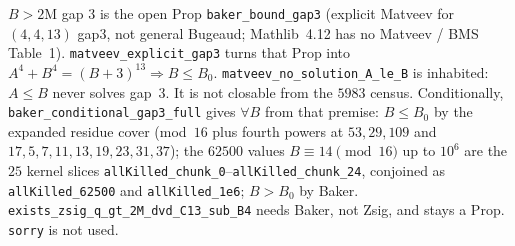 \documentclass[12pt]{amsart}
\begin{document}
$B>2\mathrm{M}$ gap $3$ is the open Prop
\texttt{baker\_bound\_gap3}
(explicit Matveev for $(4,4,13)$ gap3, not
general Bugeaud; Mathlib~4.12 has no
Matveev / BMS Table~1).
\texttt{matveev\_explicit\_gap3} turns that
Prop into $A^4+B^4=(B+3)^{13}\Rightarrow B\le B_0$.
\texttt{matveev\_no\_solution\_A\_le\_B} is
inhabited: $A\le B$ never solves gap~$3$.
It is not closable from the $5983$ census.
Conditionally,
\texttt{baker\_conditional\_gap3\_full}
gives $\forall B$ from that premise:
$B\le B_0$ by the expanded residue cover
(mod~$16$ plus fourth powers at
$53,29,109$ and $17,5,7,11,13,19,23,31,37$);
the $62500$ values $B\equiv 14\pmod{16}$
up to $10^6$ are the $25$ kernel slices
\texttt{allKilled\_chunk\_0}--\texttt{allKilled\_chunk\_24},
conjoined as \texttt{allKilled\_62500}
and \texttt{allKilled\_1e6};
$B>B_0$ by Baker.
\texttt{exists\_zsig\_q\_gt\_2M\_dvd\_C13\_sub\_B4}
needs Baker, not Zsig, and stays a Prop.
\texttt{sorry} is not used.
\end{document}
